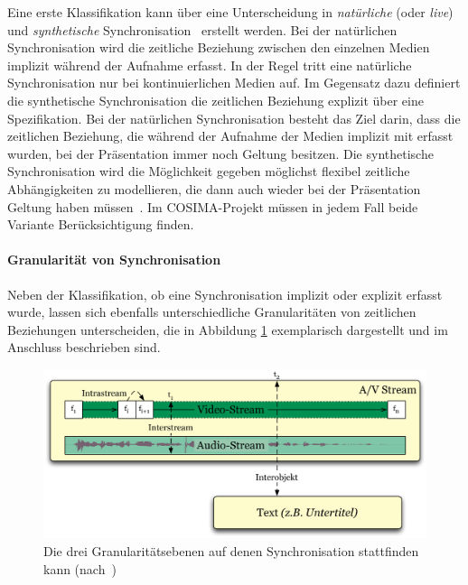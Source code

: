   Eine erste Klassifikation kann über eine Unterscheidung in \emph{natürliche} (oder \emph{live}) und \emph{synthetische} Synchronisation~\citep{little1991ms,little1991msp,steinmetz1992mst} erstellt werden. Bei der natürlichen Synchronisation wird die zeitliche Beziehung zwischen den einzelnen Medien implizit während der Aufnahme erfasst. In der Regel tritt eine natürliche Synchronisation nur bei kontinuierlichen Medien auf. Im Gegensatz dazu definiert die synthetische Synchronisation die zeitlichen Beziehung explizit über eine Spezifikation. Bei der natürlichen Synchronisation besteht das Ziel darin, dass die zeitlichen Beziehung, die während der Aufnahme der Medien implizit mit erfasst wurden, bei der Präsentation immer noch Geltung besitzen. Die synthetische Synchronisation wird die Möglichkeit gegeben möglichst flexibel zeitliche Abhängigkeiten zu modellieren, die dann auch wieder bei der Präsentation Geltung haben müssen~\citep[S. 613]{bertino1998tsm}. Im COSIMA-Projekt müssen in jedem Fall beide Variante Berücksichtigung finden.
  

\paragraph{Granularität von Synchronisation} %
\label{par:granularitaet_von_synchronisation}

  Neben der Klassifikation, ob eine Synchronisation implizit oder explizit erfasst wurde, lassen sich ebenfalls unterschiedliche Granularitäten von zeitlichen Beziehungen unterscheiden, die in Abbildung \ref{fig:granularitaetsebenen} exemplarisch dargestellt und im Anschluss beschrieben sind.
  
  \begin{figure}[!ht]
    \centering
      \includegraphics[width=.9\textwidth]{images/Granularitaetsebenen.pdf}
    \caption{Die drei Granularitätsebenen auf denen Synchronisation stattfinden kann (nach~\citep{antons09})}
    \label{fig:granularitaetsebenen}
  \end{figure}
  
